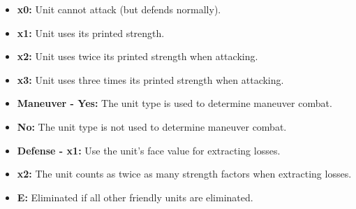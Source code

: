 \begin{minipage}{\textwidth}
  \begin{itemize}
    \item \textbf{x0:} Unit cannot attack (but defends normally).
    \item \textbf{x1:} Unit uses its printed strength.
    \item \textbf{x2:} Unit uses twice its printed strength when attacking.
    \item \textbf{x3:} Unit uses three times its printed strength when attacking.
    \item \textbf{Maneuver - Yes:} The unit type is used to determine maneuver combat.
    \item \hspace{6.5em}\textbf{No:} The unit type is not used to determine maneuver combat.
    \item \textbf{Defense - x1:} Use the unit's face value for extracting losses.
    \item \hspace{5em}\textbf{x2:} The unit counts as twice as many strength factors when extracting losses.
    \item \textbf{E:} Eliminated if all other friendly units are eliminated.
  \end{itemize}
\end{minipage}

\clearpage

{
  \setlength\tabcolsep{1.8em}
}


